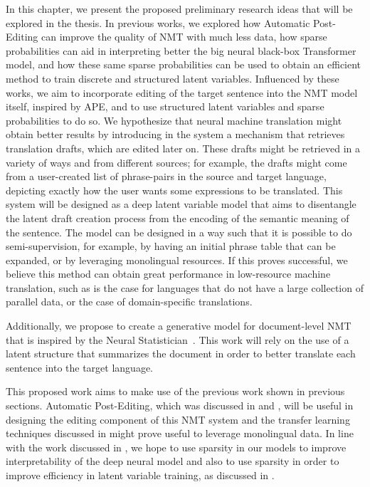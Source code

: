 \label{cap:future}

In this chapter, we present the proposed preliminary research ideas
that will be explored in the thesis. In previous works, we explored
how Automatic Post-Editing can improve the quality of NMT with much
less data, how sparse probabilities can aid in interpreting better
the big neural black-box Transformer model, and how these same sparse
probabilities can be used to obtain an efficient method to train
discrete and structured latent variables. Influenced by these works,
we aim to incorporate editing of the target sentence into the NMT
model itself, inspired by APE, and to use structured latent variables
and sparse probabilities to do so. We hypothesize that neural machine
translation might obtain better results by introducing in the system
a mechanism that retrieves translation drafts, which
are edited later on. These drafts might be retrieved in a variety of
ways and from different sources; for example, the drafts might come
from a user-created list of phrase-pairs in the source and target
language, depicting exactly how the user wants some expressions to be
translated. This system will be designed as a deep latent variable
model that aims to disentangle the latent draft creation process from
the encoding of the semantic meaning of the sentence. The model can
be designed in a way such that it is possible to do semi-supervision,
for example, by having an initial phrase table that can be expanded,
or by leveraging monolingual resources. If this proves successful, we
believe this method can obtain great performance in low-resource
machine translation, such as is the case for languages that do not
have a large collection of parallel data, or the case of
domain-specific translations.

Additionally, we propose to create a generative model for
document-level NMT that is inspired by the Neural
Statistician~\citep{edwards2017prociclr}. This work will rely on the
use of a latent structure that summarizes the document in order to
better translate each sentence into the target language.

This proposed work aims to make use of the previous work shown in
previous sections. Automatic Post-Editing, which was discussed in
 and , will be useful in designing the
editing component of this NMT system and the transfer learning
techniques discussed in  might prove useful to leverage
monolingual data. In line with the work discussed in
, we hope to use sparsity in our models to
improve interpretability of the deep neural model and also to use
sparsity in order to improve efficiency in latent variable training,
as discussed in .

